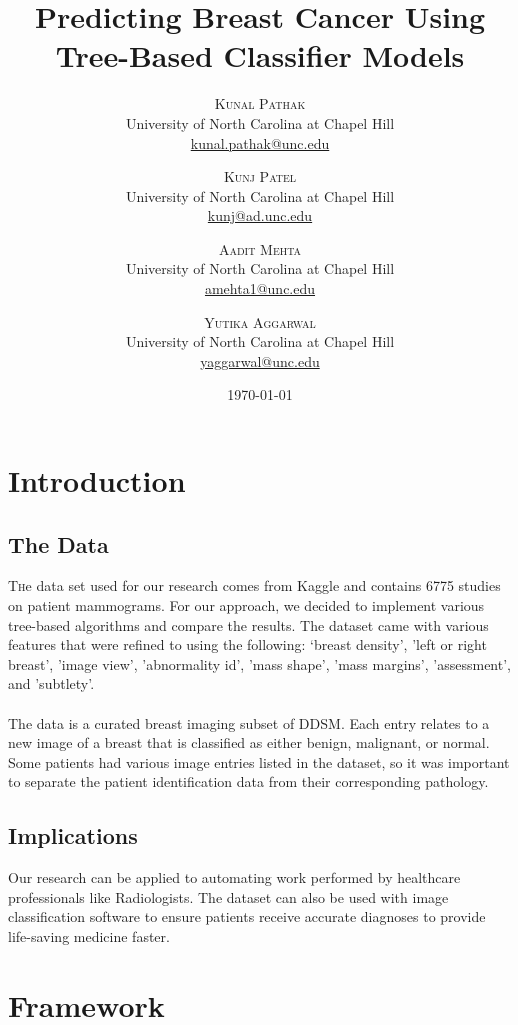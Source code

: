 \documentclass[twoside,twocolumn]{article}
\title{Predicting Breast Cancer Using Tree-Based Classifier Models} %
\author{%
\textsc{Kunal Pathak} \\[1ex] %
\normalsize University of North Carolina at Chapel Hill \\ %
\normalsize \href{mailto:john@smith.com}{kunal.pathak@unc.edu} %
\and %
\textsc{Kunj Patel} \\[1ex] %
\normalsize University of North Carolina at Chapel Hill \\ %
\normalsize \href{mailto:john@smith.com}{kunj@ad.unc.edu} %
\and %
\textsc{Aadit Mehta} \\[1ex] %
\normalsize University of North Carolina at Chapel Hill \\ %
\normalsize \href{mailto:jane@smith.com}{amehta1@unc.edu} %
\and %
\textsc{Yutika Aggarwal} \\[1ex] %
\normalsize University of North Carolina at Chapel Hill \\ %
\normalsize \href{mailto:jane@smith.com}{yaggarwal@unc.edu} %
}
\date{\today} %
\begin{document}
\maketitle


\section{Introduction}
\subsection{The Data}
\lettrine[nindent=0em,lines=3] {T}he data set used for our research comes from Kaggle and contains 6775 studies on patient mammograms. For our approach, we decided to implement various tree-based algorithms and compare the results. The dataset came with various features that were refined to using the following: ‘breast density', 'left or right breast', 'image view', 'abnormality id', 'mass shape', 'mass margins', 'assessment', and 'subtlety'.
\\ \\
The data is a curated breast imaging subset of DDSM. Each entry relates to a new image of a breast that is classified as either benign, malignant, or normal. Some patients had various image entries listed in the dataset, so it was important to separate the patient identification data from their corresponding pathology.

\subsection{Implications}
Our research can be applied to automating work performed by healthcare professionals like Radiologists. The dataset can also be used with image classification software to ensure patients receive accurate diagnoses to provide life-saving medicine faster.


\section{Framework}
\end{document}
